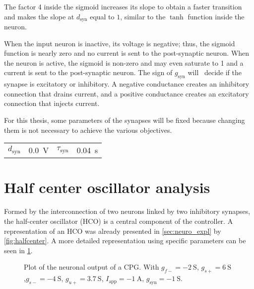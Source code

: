 The factor 4 inside the sigmoid increases its slope to obtain a faster transition and makes the slope at $d_\text{syn}$ equal to $1$, similar to the $\tanh$ function inside the neuron.

When the input neuron is inactive, its voltage is negative; thus, the sigmoid function is nearly zero and no current is sent to the post-synaptic neuron.
When the neuron is active, the sigmoid is non-zero and may even saturate to 1 and a current is sent to the post-synaptic neuron.
The sign of $g_\text{syn}$ will  decide if the synapse is excitatory or inhibitory.
A negative conductance creates an inhibitory connection that drains current, and a positive conductance creates an excitatory connection that injects current.

For this thesis, some parameters of the synapses will be fixed because changing them is not necessary to achieve the various objectives.
{

\large\centering
\begin{tabular}{lr|lr}
    $d_\text{syn}$    & \qty{0.0}{\volt} & $\tau_\text{syn}$ & \qty{0.04}{\second}
\end{tabular}

}

\section{Half center oscillator analysis}

Formed by the interconnection of two neurons linked by two inhibitory synapses, the half-center oscillator (HCO) is a central component of the controller. 
A representation of an HCO was already presented in \cref{sec:neuro_expl} by \cref{fig:halfcenter}.
A more detailed representation using specific parameters can be seen in \cref{fig:cpg_time}.

\begin{figure}[!htb] %
    \centering
    \caption{Plot of the neuronal output of a CPG. With $g_{f-}=\qty{-2}{\siemens}$, $g_{s+}=\qty{6}{\siemens}$ ,$g_{s-}=\qty{-4}{\siemens}$, $g_{u+} = \qty{3.7}{\siemens}$, $I_\text{app} = \qty{-1}{\ampere}$, $g_\text{syn} = \qty{-1}{\siemens}$.}
    \label{fig:cpg_time}
\end{figure}


